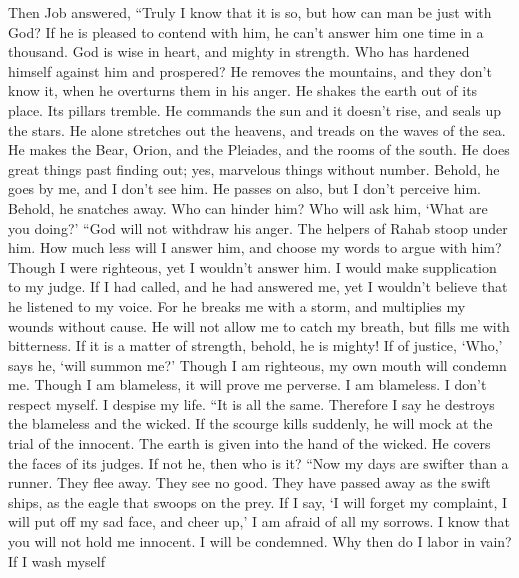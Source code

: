  Then Job answered,  ``Truly I know that it is
so, but how can man be just with God?  If he is pleased to
contend with him, he can't answer him one time in a thousand.
 God is wise in heart, and mighty in strength. Who has
hardened himself against him and prospered?  He removes the
mountains, and they don't know it, when he overturns them in his anger.
 He shakes the earth out of its place. Its pillars tremble.
 He commands the sun and it doesn't rise, and seals up the
stars.  He alone stretches out the heavens, and treads on
the waves of the sea.  He makes the Bear, Orion, and the
Pleiades, and the rooms of the south.  He does great things
past finding out; yes, marvelous things without number. 
Behold, he goes by me, and I don't see him. He passes on also, but I
don't perceive him.  Behold, he snatches away. Who can
hinder him? Who will ask him, `What are you doing?'  ``God
will not withdraw his anger. The helpers of Rahab stoop under him.
 How much less will I answer him, and choose my words to
argue with him?  Though I were righteous, yet I wouldn't
answer him. I would make supplication to my judge.  If I
had called, and he had answered me, yet I wouldn't believe that he
listened to my voice.  For he breaks me with a storm, and
multiplies my wounds without cause.  He will not allow me
to catch my breath, but fills me with bitterness.  If it is
a matter of strength, behold, he is mighty! If of justice, `Who,' says
he, `will summon me?'  Though I am righteous, my own mouth
will condemn me. Though I am blameless, it will prove me perverse.
 I am blameless. I don't respect myself. I despise my life.
 ``It is all the same. Therefore I say he destroys the
blameless and the wicked.  If the scourge kills suddenly,
he will mock at the trial of the innocent.  The earth is
given into the hand of the wicked. He covers the faces of its judges. If
not he, then who is it?  ``Now my days are swifter than a
runner. They flee away. They see no good.  They have passed
away as the swift ships, as the eagle that swoops on the prey.
 If I say, `I will forget my complaint, I will put off my
sad face, and cheer up,'  I am afraid of all my sorrows. I
know that you will not hold me innocent.  I will be
condemned. Why then do I labor in vain?  If I wash myself
